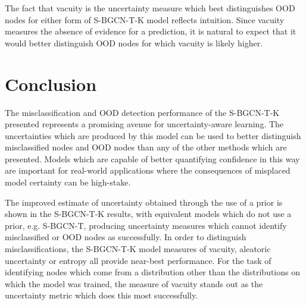 \documentclass[journal]{IEEEtran}
\begin{document}
The fact that vacuity is the uncertainty measure which best distinguishes OOD nodes for either form of S-BGCN-T-K model reflects intuition. Since vacuity measures the absence of evidence for a prediction, it is natural to expect that it would better distinguish OOD nodes for which vacuity is likely higher. 

\section{Conclusion}
\label{sec::conclusion}

The misclassification and OOD detection performance of the S-BGCN-T-K presented represents a promising avenue for uncertainty-aware learning. The uncertainties which are produced by this model can be used to better distinguish misclassified nodes and OOD nodes than any of the other methods which are presented. Models which are capable of better quantifying confidence in this way are important for real-world applications where the consequences of misplaced model certainty can be high-stake. 

The improved estimate of uncertainty obtained through the use of a prior is shown in the S-BGCN-T-K results, with equivalent models which do not use a prior, e.g. S-BGCN-T, producing uncertainty measures which cannot identify misclassified or OOD nodes as successfully. In order to distinguish misclassifications, the S-BGCN-T-K model measures of vacuity, aleatoric uncertainty or entropy all provide near-best performance. For the task of identifying nodes which come from a distribution other than the distributions on which the model was trained, the measure of vacuity stands out as the uncertainty metric which does this most successfully.



%
\end{document}
